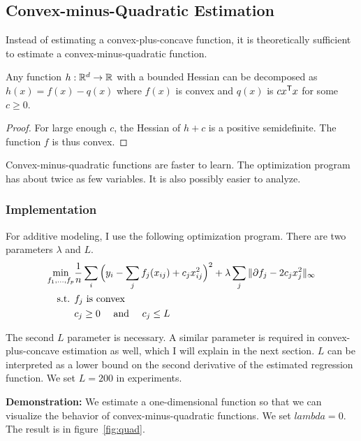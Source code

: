 \documentclass{article}
\begin{document}
{\subsection{Convex-minus-Quadratic Estimation}

Instead of estimating a convex-plus-concave function, it is theoretically sufficient to estimate a convex-minus-quadratic function. 

\begin{theorem}
Any function $h : \mathbb{R}^d \rightarrow \mathbb{R}$ with a bounded Hessian can be decomposed as $h(x) = f(x) - q(x)$ where $f(x)$ is convex and $q(x)$ is $c x^{\mathsf{T}} x$ for some $c \geq 0$. 
\end{theorem}

\begin{proof}
For large enough $c$, the Hessian of $h + c$ is a positive semidefinite. The function $f$ is thus convex.
\end{proof}

Convex-minus-quadratic functions are faster to learn. The optimization program has about twice as few variables. It is also possibly easier to analyze. \\

\subsubsection{Implementation}

For additive modeling, I use the following optimization program. There are two parameters $\lambda$ and $L$. 
\begin{align*}
\min_{f_1, ..., f_p} & \frac{1}{n} \sum_i 
  \Big(y_i - \sum_j f_j(x_{ij}) + c_j x_{ij}^2 \Big)^2 + 
  \lambda \sum_j \| \partial f_j - 2 c_j x_j^2 \|_\infty \\
\textrm{s.t. } & f_j \textrm{ is convex} \\
  & c_j \geq 0 \quad \textrm{ and } \quad c_j \leq L
\end{align*}

The second $L$ parameter is necessary. A similar parameter is required in convex-plus-concave estimation as well, which I will explain in the next section. $L$ can be interpreted as a lower bound on the second derivative of the estimated regression function. We set $L=200$ in experiments.


\textbf{Demonstration:} We estimate a one-dimensional function so that we can visualize the behavior of convex-minus-quadratic functions. We set $lambda = 0$. The result is in figure~\ref{fig:quad}.

}
\end{document}
